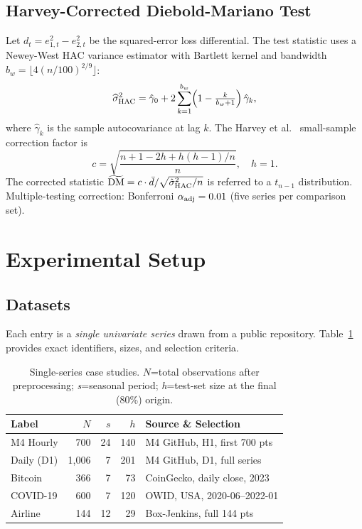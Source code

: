 \documentclass[sn-mathphys-num,pdflatex]{sn-jnl}
\begin{document}
\subsection{Harvey-Corrected Diebold-Mariano Test}
\label{sec:dm}

Let $d_t = e_{1,t}^2 - e_{2,t}^2$ be the squared-error loss
differential. The test statistic uses a Newey-West HAC variance
estimator with Bartlett kernel and bandwidth
$b_w = \lfloor 4(n/100)^{2/9}\rfloor$:
\begin{equation}
\widehat{\sigma}^2_{\rm HAC} =
\hat{\gamma}_0 + 2\sum_{k=1}^{b_w}\!\left(1-\tfrac{k}{b_w{+}1}\right)\hat{\gamma}_k,
\label{eq:hac}
\end{equation}
where $\hat{\gamma}_k$ is the sample autocovariance at lag $k$.
The Harvey et al.~\cite{harvey1997} small-sample correction factor is
\begin{equation}
c = \sqrt{\frac{n+1-2h+h(h-1)/n}{n}},\quad h=1.
\label{eq:harvey}
\end{equation}
The corrected statistic $\widetilde{\rm DM} = c \cdot \bar{d} /
\sqrt{\hat{\sigma}^2_{\rm HAC}/n}$ is referred to a $t_{n-1}$
distribution. Multiple-testing correction: Bonferroni
$\alpha_{\rm adj}=0.01$ (five series per comparison set).

\section{Experimental Setup}
\label{sec:setup}

\subsection{Datasets}
\label{sec:data}

Each entry is a \emph{single univariate series} drawn from a public
repository. Table~\ref{tab:datasets} provides exact identifiers,
sizes, and selection criteria.

\begin{table}[ht]
\caption{Single-series case studies. $N$=total observations after
preprocessing; \textit{s}=seasonal period; \textit{h}=test-set size
at the final (80\%) origin.}
\label{tab:datasets}
\centering
\small
\setlength{\tabcolsep}{3pt}
\begin{tabular}{@{}lrrrl@{}}
\toprule
\textbf{Label} & \textbf{$N$} & \textbf{$s$} & \textbf{$h$}
& \textbf{Source \& Selection} \\
\midrule
M4 Hourly & 700 & 24 & 140 & M4 GitHub, H1, first 700 pts \\
Daily (D1) & 1{,}006 & 7 & 201 & M4 GitHub, D1, full series \\
Bitcoin & 366 & 7 & 73 & CoinGecko, daily close, 2023 \\
COVID-19 & 600 & 7 & 120 & OWID, USA, 2020-06--2022-01 \\
Airline & 144 & 12 & 29 & Box-Jenkins, full 144 pts \\
\bottomrule
\end{tabular}
\end{table}
\end{document}
